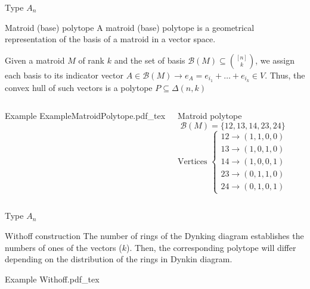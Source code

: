 \documentclass{beamer}
\newcommand{\incfig}[1]{%
\center
\def\svgwidth{0.9\columnwidth}
{#1.pdf_tex}
}
\begin{document}
\begin{frame}{Type $A_n$}
\begin{block}{Matroid (base) polytope}
A matroid (base) polytope is a geometrical representation of the basis of a matroid in a vector space. 

Given a matroid $M$ of rank $k$ and the set of basis $\mathcal{B}(M)\subseteq \binom{[n]}{k}$, we assign each basis to its indicator vector $A\in \mathcal{B}(M) \to e_A = e_{i_1} + \ldots + e_{i_k}\in V$. Thus, the convex hull of such vectors is a polytope $P\subseteq \Delta(n,k)$ 
\end{block}  
\begin{columns}[c]
\vspace{-1em}
\begin{block}{Example}
\incfig{ExampleMatroidPolytope}
\end{block}
\vspace{-1em}
\begin{block}{Matroid polytope}
  \[
  \mathcal{B}(M) = \{12, 13, 14, 23, 24\}
  \] 
  \vspace{-1em}
  \[
  \text{Vertices } \begin{cases}
    12 \to (1, 1, 0, 0)\\
	13 \to (1, 0, 1, 0)\\
	14 \to (1, 0, 0, 1)\\
	23 \to (0, 1, 1, 0)\\
	24 \to  (0, 1, 0, 1)
  \end{cases}
  \] 
\end{block}
\end{columns}
\end{frame}



\begin{frame}{Type $A_n$}
  \begin{block}{Withoff construction}
  The number of rings of the Dynking diagram establishes the numbers of ones of the vectors ($k$). Then, the corresponding polytope will differ depending on the distribution of the rings in Dynkin diagram.
  \end{block}
  \begin{block}{Example}
   \incfig{Withoff} 
  \end{block}
\end{frame}
\end{document}
